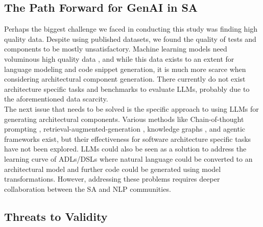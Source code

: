 \subsection{The Path Forward for GenAI in SA} \label{path-forward}
Perhaps the biggest challenge we faced in conducting this study was finding high quality data. Despite using published datasets, we found the quality of tests and components to be mostly unsatisfactory. Machine learning models need voluminous high quality data \cite{jain_data_quality_ml}, and while this data exists to an extent for language modeling and code snippet generation, it is much more scarce when considering architectural component generation. There currently do not exist architecture specific tasks and benchmarks to evaluate LLMs, probably due to the aforementioned data scarcity. \\
The next issue that needs to be solved is the specific approach to using LLMs for generating architectural components. Various methods like Chain-of-thought prompting \cite{wei2022chainofthought}, retrieval-augmented-generation \cite{lewis2020rag}, knowledge graphs \cite{pan2024llmkg} \cite{abdelaziz2021codekg}, and agentic frameworks \cite{huang2023agentcoder, zhuge2024agentasajudge} exist, but their effectiveness for software architecture specific tasks have not been explored. LLMs could also be seen as a solution to address the learning curve of ADLs/DSLs where natural language could be converted to an architectural model and further code could be generated using model transformations. However, addressing these problems requires deeper collaboration between the SA and NLP communities. 

\subsection{Threats to Validity}
